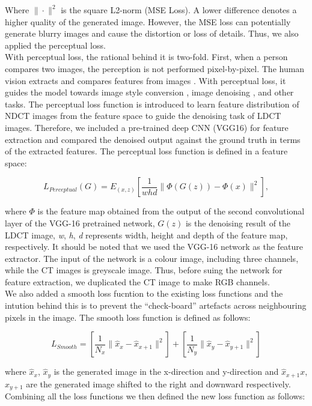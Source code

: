\documentclass[journal]{IEEEtran}
\begin{document}
Where $\|\cdot\|^2$ is the square L2-norm (MSE Loss).  A lower difference denotes a higher quality of the generated image.  However, the MSE loss can potentially generate blurry images and cause the distortion or loss of details.  Thus, we also applied the perceptual loss.\\
	With perceptual loss, the rational behind it is two-fold.  First, when a person compares two images, the perception is not performed pixel-by-pixel.  The human vision extracts and compares features from images \cite{nixon2019feature}.  With perceptual loss, it guides the model towards image style conversion \cite{johnson2016perceptual}, image denoising \cite{8340157}, and other tasks.  The perceptual loss function is introduced to learn feature distribution of NDCT images from the feature space to guide the denoising task of LDCT images.  Therefore, we included a pre-trained deep CNN (VGG16) for feature extraction and compared the denoised output against the ground truth in terms of the extracted features.  The perceptual loss function is defined in a feature space:
	
\begin{equation}
	L_{Perceptual}(G) = E_{(x,z)}\left[ \frac{1}{whd}\|\Phi(G(z))-\Phi(x)\|^2 \right],
\end{equation}

	where $\Phi$ is the feature map obtained from the output of the second convolutional layer of the VGG-16 pretrained network, $G(z)$ is the denoising result of the LDCT image, \emph{w}, \emph{h}, \emph{d} represents width, height and depth of the feature map, respectively.  It should be noted that we used the VGG-16 network as the feature extractor.  The input of the network is a colour image, including three channels, while the CT images is greyscale image.  Thus, before suing the network for feature extraction, we duplicated the CT image to make RGB channels.\\
	We also added a smooth loss fucntion to the existing loss functions and the intution behind this is to prevent the ``check-board'' artefacts across neighbouring pixels in the image.  The smooth loss function is defined as follows:

\begin{equation}
	L_{Smooth} = \left[ \frac{1}{N_x}\|\hat{x}_x - \hat{x}_{x+1}\|^2 \right]+ \left[ \frac{1}{N_y}\|\hat{x}_y - \hat{x}_{y+1}\|^2 \right]
\end{equation}

	where $\hat{x}_x$, $\hat{x}_y$ is the generated image in the x-direction and y-direction and $\hat{x}_{x+1}x$, $\hat{x}_{y+1}$ are the generated image shifted to the right and downward respectively.
	Combining all the loss functions we then defined the new loss function as follows:
	
\end{document}
